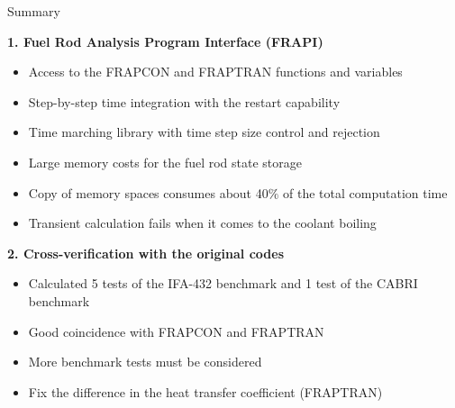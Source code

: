 \begin{frame}{Summary}
    \scriptsize
    \center

    \begin{block}{\textbf{1. Fuel Rod Analysis Program Interface (FRAPI)}}

        \begin{itemize}
            \color{applegreen}
            \item Access to the FRAPCON and FRAPTRAN functions and variables
            \item Step-by-step time integration with the restart capability
            \item Time marching library with time step size control and rejection
            \color{bittersweet}
            \item Large memory costs for the fuel rod state storage
            \item Copy of memory spaces consumes about 40$\%$ of the total computation time
            \item Transient calculation fails when it comes to the coolant boiling
        \end{itemize}

    \end{block}

    \begin{block}{\textbf{2. Cross-verification with the original codes}}

        \begin{itemize}
            \color{applegreen}
            \item Calculated 5 tests of the IFA-432 benchmark and 1 test of the CABRI benchmark
            \item Good coincidence with FRAPCON and FRAPTRAN
            \color{bittersweet}
            \item More benchmark tests must be considered
            \item Fix the difference in the heat transfer coefficient (FRAPTRAN)
        \end{itemize}

    \end{block}

\end{frame}